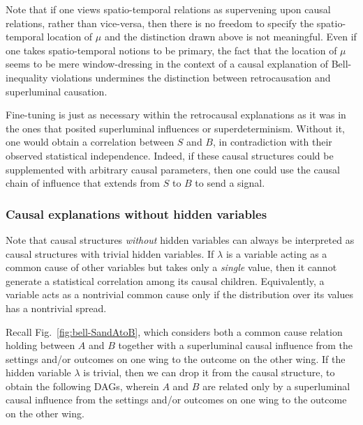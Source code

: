 \documentclass[letterpaper,onecolumn,nofootinbib]{revtex4}
\begin{document}
Note that if one views spatio-temporal relations as supervening upon causal relations, rather than vice-versa, then there is no freedom to specify the spatio-temporal location of $\mu$ and the distinction drawn above is not meaningful. Even if one takes spatio-temporal notions to be primary, the fact that the location of $\mu$ seems to be mere window-dressing in the context of a causal explanation of Bell-inequality violations undermines the distinction between retrocausation and superluminal causation.

Fine-tuning is just as necessary within the retrocausal explanations as it was in the ones that posited superluminal influences or superdeterminism.  Without it, one would obtain a correlation between $S$ and $B$, in contradiction with their observed statistical independence. Indeed, if these causal structures could be supplemented with arbitrary causal parameters, then one could use the causal chain of influence that extends from $S$ to $B$ to send a signal.


\subsubsection{Causal explanations without hidden variables}

Note that causal structures \emph{without} hidden variables can always be interpreted as causal structures with trivial hidden variables.  
If $\lambda$ is a variable acting as a common cause of other variables but takes only a \emph{single} value, then it cannot generate a statistical correlation among its causal children.  Equivalently, a variable acts as a nontrivial common cause only if the distribution over its values has a nontrivial spread.

Recall Fig.~\ref{fig:bell-SandAtoB}, which considers both a common cause relation holding between $A$ and $B$ together with a superluminal causal influence from the settings and/or outcomes on one wing to the outcome on the other wing.  If the hidden variable $\lambda$ is trivial, then we can drop it from the causal structure, to obtain the following DAGs, wherein $A$ and $B$ are related only by a superluminal causal influence from the settings and/or outcomes on one wing to the outcome on the other wing. 
\end{document}
